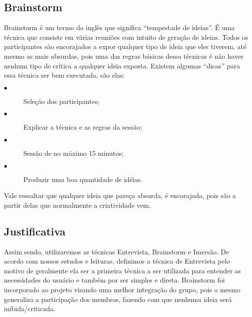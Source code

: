 \subsection{Brainstorm}
Brainstorm é um termo do inglês que significa “tempestade de ideias”. É uma técnica que consiste em várias reuniões com intuito de geração de ideias. Todos os participantes são encorajados a expor qualquer tipo de ideia que eles tiverem, até mesmo as mais absurdas, pois uma das regras básicas dessa técnicas é não haver nenhum tipo de crítica a qualquer ideia exposta. Existem algumas “dicas” para essa técnica ser bem executada, são elas:
\begin{description}
\item[$\bullet$] Seleção dos participantes;
\item[$\bullet$] Explicar a técnica e as regras da sessão;
\item[$\bullet$] Sessão de no máximo 15 minutos;
\item[$\bullet$] Produzir uma boa quantidade de idéias.
\end{description}
Vale ressaltar que qualquer ideia que pareça absurda, é encorajada, pois são a partir delas que normalmente a criatividade vem.
\subsection{Justificativa}
Assim sendo, utilizaremos as técnicas Entrevista, Brainstorm e Imersão. De acordo com nossos estudos e leituras, definimos a técnica de Entrevista pelo motivo de geralmente ela ser a primeira técnica a ser utilizada para entender as necessidades do usuário e também por ser simples e direta. Brainstorm foi incorporado ao projeto visando uma melhor integração do grupo, pois o mesmo generaliza a participação dos membros, fazendo com que nenhuma ideia será inibida/criticada.


